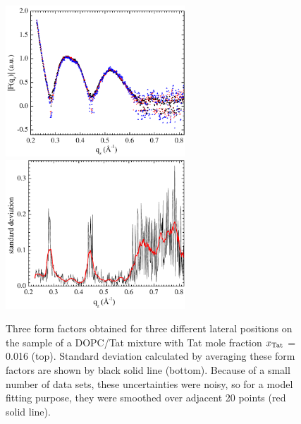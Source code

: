 \begin{figure}[htbp]
  \centering
  \includegraphics[width=0.6\textwidth]{figures/Tat/NFIT_results/three_form_factors}
  \includegraphics[width=0.6\textwidth]{figures/Tat/NFIT_results/standard_deviation}
  \caption{Three form factors obtained for three different lateral positions
  on the sample of a DOPC/Tat mixture with Tat mole fraction $x_\textrm{Tat}$ = 0.016 (top).
  Standard deviation calculated by averaging these form factors are shown
  by black solid line (bottom). Because of a small number of data sets, these 
  uncertainties were noisy, so for a model fitting purpose, they were smoothed
  over adjacent 20 points (red solid line).}
  \label{fig:form_factor_uncertainty}
\end{figure}

